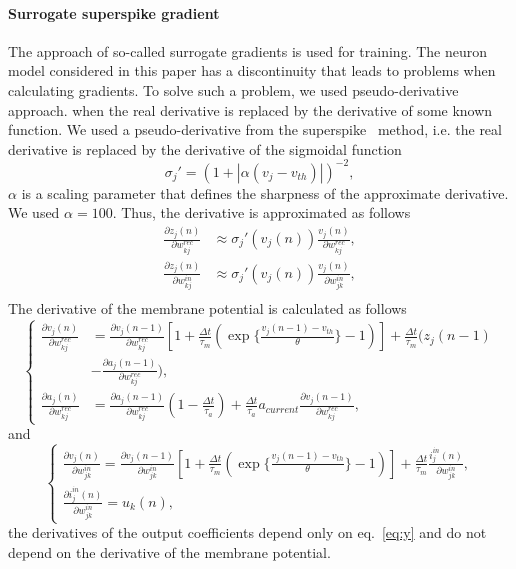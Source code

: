 \documentclass{article}
\begin{document}
\paragraph{Surrogate superspike gradient}
The approach of so-called surrogate gradients \cite{neftci2019surrogate} is used for training. The neuron model considered in this paper has a discontinuity that leads to problems when calculating gradients. To solve such a problem, we used  pseudo-derivative approach. when the real derivative is replaced by the derivative of some known function. We used a pseudo-derivative from the superspike~\cite{zenke2018superspike} method, i.e. the real derivative is replaced by the derivative of the sigmoidal function
\begin{equation}
    \sigma_j' = (1 + |\alpha (v_j - v_{th})|)^{-2},
\end{equation}
$\alpha$ is a scaling parameter that defines the sharpness of the approximate derivative. We used $\alpha = 100$.
Thus, the derivative is approximated as follows
\begin{equation}
    \begin{aligned}
        \frac{\partial z_j(n)}{\partial w_{kj}^{rec}} & \approx \sigma_j'(v_j(n))\frac{v_j(n)}{\partial w_{kj}^{rec}}, \\
        \frac{\partial z_j(n)}{\partial w_{kj}^{in}}  & \approx \sigma_j'(v_j(n))\frac{v_j(n)}{\partial w_{jk}^{in}},  \\
    \end{aligned}
\end{equation}
The derivative of the membrane potential is calculated as follows
\begin{equation}
    \begin{cases}
        \frac{\partial v_j(n)}{\partial w^{rec}_{kj}} & = \frac{\partial v_j(n-1)}{\partial w^{rec}_{kj}}[1 + \frac{\Delta t}{\tau_m}(\exp{\{\frac{v_j(n-1) - v_{th}}{\theta}\}} - 1)] + \frac{\Delta t}{\tau_m}(z_j(n-1)     \\
                                                      & - \frac{\partial a_j(n-1)}{\partial w^{rec}_{kj}}),                                                                                                                   \\
        \frac{\partial a_j(n)}{\partial w^{rec}_{kj}} & = \frac{\partial a_j(n-1)}{\partial w^{rec}_{kj}}(1 - \frac{\Delta t}{\tau_a}) + \frac{\Delta t}{\tau_a} a_{current} \frac{\partial v_j(n-1)}{\partial w^{rec}_{kj}},
    \end{cases}
\end{equation}
and
\begin{equation}
    \begin{cases}
        \frac{\partial v_j(n)}{\partial w^{in}_{jk}} =  \frac{\partial v_j(n - 1)}{\partial w^{in}_{jk}}  [1 + \frac{\Delta t}{\tau_m}(\exp{\{\frac{v_j(n-1) - v_{th}}{\theta}\}} - 1)] + \frac{\Delta t}{\tau_m}\frac{i_j^{in}(n)}{\partial w_{jk}^{in}}, \\
        \frac{\partial i_j^{in}(n)}{\partial w_{jk}^{in}} = u_k(n),
    \end{cases}
\end{equation}
the derivatives of the output coefficients depend only on eq.~\ref{eq:y} and do not depend on the derivative of the membrane potential.
\end{document}
